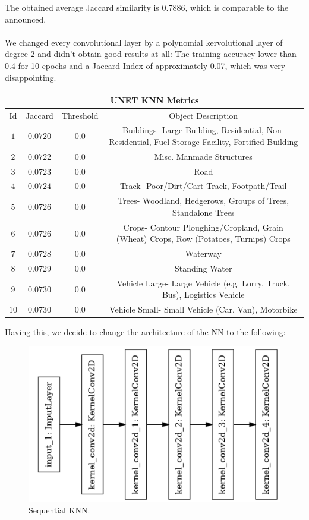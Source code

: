 \documentclass{article}
\begin{document}
The obtained average Jaccard similarity is 0.7886, which is comparable to the announced.\\
\\
We changed every convolutional layer by a polynomial kervolutional layer of degree 2 and didn't obtain good results at all: The training accuracy lower than 0.4 for 10 epochs and a Jaccard Index of approximately 0.07, which was very disappointing.

\begin{center}
 \begin{tabular}{ |c|c|c|c| } 
 \hline
 \multicolumn{4}{|c|}{UNET KNN Metrics}\\
 \hline
 \hline
 Id & Jaccard & Threshold & Object Description \\  
 \hline
 \hline
$1$ & $0.0720$ & $0.0$ & \scriptsize Buildings- Large Building, Residential, Non-Residential, Fuel Storage Facility, Fortified Building\\
\hline
$2$ & $0.0722$ & $0.0$ & \scriptsize Misc. Manmade Structures\\
\hline
$3$ & $0.0723$ & $0.0$ & \scriptsize Road\\
\hline
$4$ & $0.0724$ & $0.0$ & \scriptsize Track- Poor/Dirt/Cart Track, Footpath/Trail\\
\hline
$5$ & $0.0726$ & $0.0$ & \scriptsize Trees- Woodland, Hedgerows, Groups of Trees, Standalone Trees\\
\hline
$6$ & $0.0726$ & $0.0$ & \scriptsize Crops- Contour Ploughing/Cropland, Grain (Wheat) Crops, Row (Potatoes, Turnips) Crops\\
\hline
$7$ & $0.0728$ & $0.0$ & \scriptsize Waterway\\
\hline
$8$ & $0.0729$ & $0.0$ & \scriptsize Standing Water\\
\hline
$9$ & $0.0730$ & $0.0$ & \scriptsize Vehicle Large- Large Vehicle (e.g. Lorry, Truck, Bus), Logistics Vehicle\\
\hline
$10$ & $0.0730$ & $0.0$ & \scriptsize Vehicle Small- Small Vehicle (Car, Van), Motorbike\\
\hline
\end{tabular}
\end{center}
\newpage
Having this, we decide to change the architecture of the NN to the following:
\begin{figure}[h!]
    \center
    \includegraphics[width=0.35\linewidth]{Images/SEQKNN.png}
    \caption{Sequential KNN.}
\end{figure}
\end{document}

